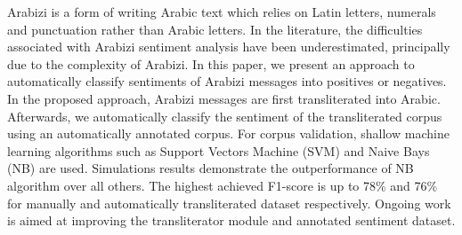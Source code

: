 Arabizi is a form of writing Arabic text which relies on Latin letters, numerals and punctuation rather than Arabic letters. In the literature, the difficulties associated with Arabizi sentiment analysis have been underestimated, principally due to the complexity of Arabizi. In this paper, we present an approach to automatically classify sentiments of Arabizi messages into positives or negatives. In the proposed approach, Arabizi messages are first transliterated into Arabic. Afterwards, we automatically classify the sentiment of the transliterated corpus using an automatically annotated corpus. For corpus validation, shallow machine learning algorithms such as Support Vectors Machine (SVM) and Naive Bays (NB) are used. Simulations results demonstrate the outperformance of NB algorithm over all others. The highest achieved F1-score is up to 78\% and 76\% for manually and automatically transliterated dataset respectively. Ongoing work is aimed at improving the transliterator module and annotated sentiment dataset.
